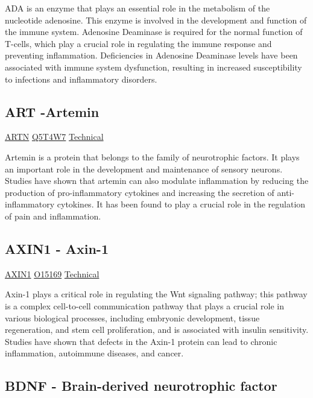 ADA is an enzyme that plays an essential role in the metabolism of the nucleotide adenosine. This enzyme is involved in the development and function of the immune system. Adenosine Deaminase is required for the normal function of T-cells, which play a crucial role in regulating the immune response and preventing inflammation. Deficiencies in Adenosine Deaminase levels have been associated with immune system dysfunction, resulting in increased susceptibility to infections and inflammatory disorders.


\subsection{ART -Artemin}

\href{https://en.wikipedia.org/wiki/Artemin}{ARTN}
\href{http://www.uniprot.org/uniprot/Q5T4W7}{Q5T4W7}
\href{https://olink.com/products-services/target/protein/?assayID=5102}{Technical}


Artemin is a protein that belongs to the family of neurotrophic factors. It plays an important role in the development and maintenance of sensory neurons. Studies have shown that artemin can also modulate inflammation by reducing the production of pro-inflammatory cytokines and increasing the secretion of anti-inflammatory cytokines. It has been found to play a crucial role in the regulation of pain and inflammation.

\subsection{AXIN1 - Axin-1}

\href{https://en.wikipedia.org/wiki/AXIN1}{AXIN1}
\href{http://www.uniprot.org/uniprot/O15169}{O15169}
\href{https://olink.com/products-services/target/protein/?assayID=5078}{Technical}

Axin-1 plays a critical role in regulating the Wnt signaling pathway; this pathway is a complex cell-to-cell communication pathway that plays a crucial role in various biological processes, including embryonic development, tissue regeneration, and stem cell proliferation, and is associated with insulin sensitivity. Studies have shown that defects in the Axin-1 protein can lead to chronic inflammation, autoimmune diseases, and cancer.

\subsection{BDNF - Brain-derived neurotrophic factor}

